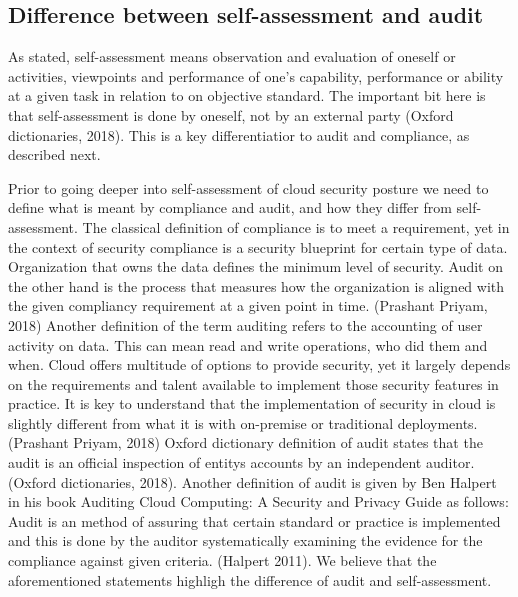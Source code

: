 \documentclass{article}
\begin{document}
\subsection{Difference between self-assessment and audit}
As stated, self-assessment means observation and evaluation of oneself or activities, viewpoints and performance of one's capability, performance or ability at a given task in relation to on objective standard. The important bit here is that self-assessment is done by oneself, not by an external party (Oxford dictionaries, 2018). This is a key differentiatior to audit and compliance, as described next.
\par
Prior to going deeper into self-assessment of cloud security posture we need to define what is meant by compliance and audit, and how they differ from self-assessment.
The classical definition of compliance is to meet a requirement, yet in the context of security compliance is a security blueprint for certain type of data. Organization that owns the data defines the minimum level of security.
Audit on the other hand is the process that measures how the organization is aligned with the given compliancy requirement at a given point in time. (Prashant Priyam, 2018)
Another definition of the term auditing refers to the accounting of user activity on data. This can mean read and write operations, who did them and when.
Cloud offers multitude of options to provide security, yet it largely depends on the requirements and talent available to implement those security features in practice. It is key to understand that the implementation of security in cloud is slightly different from what it is with on-premise or traditional deployments. (Prashant Priyam, 2018)
Oxford dictionary definition of audit states that the audit is an official inspection of entitys accounts by an independent auditor. (Oxford dictionaries, 2018). Another definition of audit is given by Ben Halpert in his book Auditing Cloud Computing: A Security and Privacy Guide as follows: Audit is an method of assuring that certain standard or practice is implemented and this is done by the auditor systematically examining the evidence for the compliance against given criteria. (Halpert 2011). We believe that the aforementioned statements highligh the difference of audit and self-assessment. 
\end{document}
